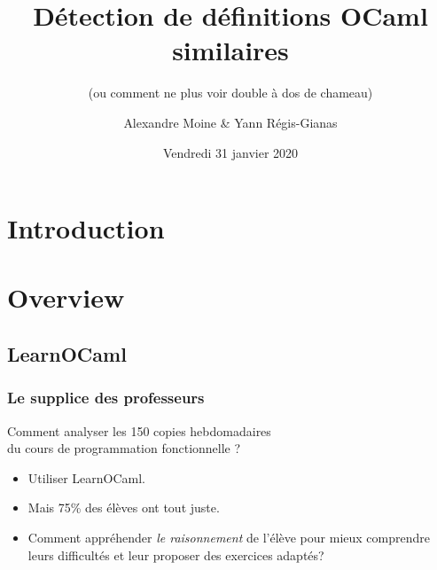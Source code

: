 \documentclass[11pt]{beamer}
\begin{document}
	\author{Alexandre Moine \& Yann Régis-Gianas}
	\title{Détection de définitions OCaml similaires}
	\subtitle{(ou comment ne plus voir double à dos de chameau)}
	\date{Vendredi 31 janvier 2020}
	\begin{frame}[plain]
		\maketitle
	\end{frame}

\section{Introduction}

\section{Overview}
\subsection{LearnOCaml}
\begin{frame}
	\frametitle{Le supplice des professeurs}
\begin{center}
\Large
Comment analyser les 150 copies hebdomadaires \\ du cours de programmation fonctionnelle ?
\end{center}
\pause
\bigskip
\begin{itemize}
\item Utiliser LearnOCaml.
\pause
\item Mais 75\% des élèves ont tout juste.
\item Comment appréhender \emph{le raisonnement} de l'élève pour mieux comprendre leurs
  difficultés et leur proposer des exercices adaptés?
\end{itemize}
\end{frame}
\end{document}
